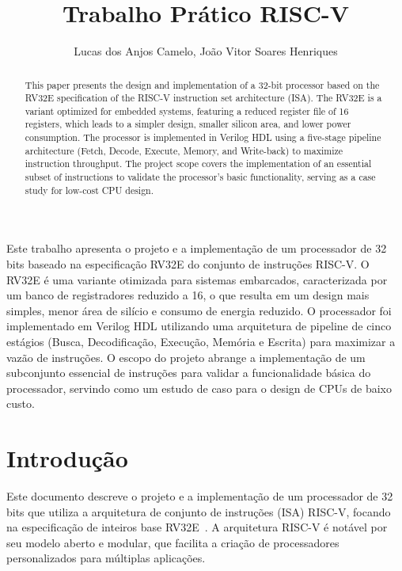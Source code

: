 \documentclass[12pt]{article}
\title{Trabalho Prático RISC-V}
\author{Lucas dos Anjos Camelo\inst{1}, João Vitor Soares Henriques\inst{2}}
\begin{document}
 

\maketitle

\begin{abstract}
 This paper presents the design and implementation of a 32-bit processor based on the RV32E specification of the RISC-V instruction set architecture (ISA). The RV32E is a variant optimized for embedded systems, featuring a reduced register file of 16 registers, which leads to a simpler design, smaller silicon area, and lower power consumption. The processor is implemented in Verilog HDL using a five-stage pipeline architecture (Fetch, Decode, Execute, Memory, and Write-back) to maximize instruction throughput. The project scope covers the implementation of an essential subset of instructions to validate the processor's basic functionality, serving as a case study for low-cost CPU design.
\end{abstract}
     
\begin{resumo} 
Este trabalho apresenta o projeto e a implementação de um processador de 32 bits baseado na especificação RV32E do conjunto de instruções RISC-V. O RV32E é uma variante otimizada para sistemas embarcados, caracterizada por um banco de registradores reduzido a 16, o que resulta em um design mais simples, menor área de silício e consumo de energia reduzido. O processador foi implementado em Verilog HDL utilizando uma arquitetura de pipeline de cinco estágios (Busca, Decodificação, Execução, Memória e Escrita) para maximizar a vazão de instruções. O escopo do projeto abrange a implementação de um subconjunto essencial de instruções para validar a funcionalidade básica do processador, servindo como um estudo de caso para o design de CPUs de baixo custo.
\end{resumo}


\section{Introdução}

Este documento descreve o projeto e a implementação de um processador de 32 bits que utiliza a arquitetura de conjunto de instruções (ISA) RISC-V, focando na especificação de inteiros base RV32E~\cite{riscv-spec}. A arquitetura RISC-V é notável por seu modelo aberto e modular, que facilita a criação de processadores personalizados para múltiplas aplicações.
\end{document}

